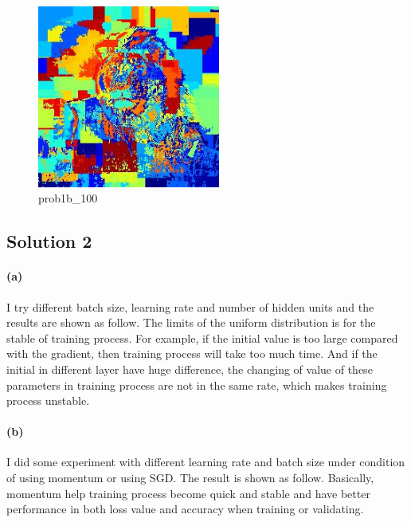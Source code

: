 \documentclass{article}
\newcommand{\solution}[1]{\clearpage \subsection*{Solution #1}}
\newcommand{\spart}[1]{\paragraph{(#1)}}
\begin{document}
\begin{figure}[!h]
  \centering
  \includegraphics[height=6cm]{code/outputs/prob1b_100.jpg}
  \caption{prob1b\_100}
\end{figure}

\solution{2} 
\spart{a} 
I try different batch size, learning rate and number of hidden units and the results are shown as follow.
The limits of the uniform distribution is for the stable of training process. 
For example, if the initial value is too large compared with the gradient, then training process will take too much time.
And if the initial in different layer have huge difference, the changing of value of these parameters in training process are not in the same rate, which makes training process unstable.

\spart{b}
I did some experiment with different learning rate and batch size under condition of using momentum or using SGD. The result is shown as follow.
Basically, momentum help training process become quick and stable and have better performance in both loss value and accuracy when training or validating.
\end{document}
